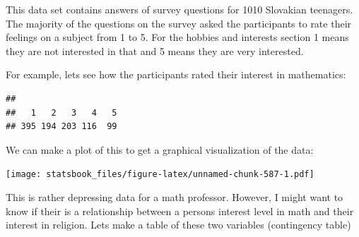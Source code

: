 \documentclass[
]{book}
\newenvironment{Shaded}{\begin{snugshade}}{\end{snugshade}}
\newcommand{\AttributeTok}[1]{\textcolor[rgb]{0.77,0.63,0.00}{#1}}
\newcommand{\FunctionTok}[1]{\textcolor[rgb]{0.00,0.00,0.00}{#1}}
\newcommand{\NormalTok}[1]{#1}
\newcommand{\SpecialCharTok}[1]{\textcolor[rgb]{0.00,0.00,0.00}{#1}}
\newcommand{\StringTok}[1]{\textcolor[rgb]{0.31,0.60,0.02}{#1}}
\theoremstyle{definition}
\theoremstyle{definition}
\theoremstyle{definition}
\theoremstyle{definition}
\theoremstyle{remark}
\begin{document}
This data set contains answers of survey questions for 1010 Slovakian teenagers. The majority of the questions on the survey asked the participants to rate their feelings on a subject from 1 to 5. For the hobbies and interests section 1 means they are not interested in that and 5 means they are very interested.

For example, lets see how the participants rated their interest in mathematics:

\begin{Shaded}
\end{Shaded}

\begin{verbatim}
## 
##   1   2   3   4   5 
## 395 194 203 116  99
\end{verbatim}

We can make a plot of this to get a graphical visualization of the data:

\begin{Shaded}
\end{Shaded}

\texttt{[image: statsbook\_files/figure-latex/unnamed-chunk-587-1.pdf]}

This is rather depressing data for a math professor. However, I might want to know if their is a relationship between a persons interest level in math and their interest in religion. Lets make a table of these two variables (contingency table)

\begin{Shaded}
\end{Shaded}
\end{document}

